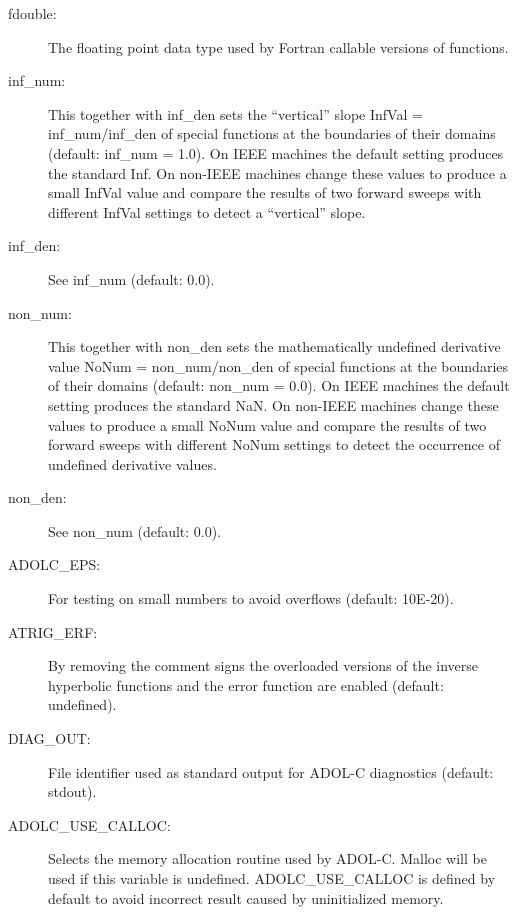 \documentclass[11pt,twoside]{article}
\begin{document}
\begin{description}
\item[{\sf fdouble}{\rm :}] The floating point data type used by Fortran callable versions of functions.

\item[{\sf inf\_num}{\rm :}] This together with {\sf inf\_den}
sets the ``vertical'' slope {\sf InfVal} = {\sf inf\_num/inf\_den}  
of special functions at the boundaries of their domains (default: {\sf inf\_num} = 1.0). On IEEE machines 
the default setting produces the standard {\sf Inf}. On non-IEEE machines
change these values to produce a small {\sf InfVal} value and compare
the results of two forward sweeps with different {\sf InfVal} settings
to detect a ``vertical'' slope.

\item[{\sf inf\_den}{\rm :}] See {\sf inf\_num} (default: 0.0).

\item[{\sf non\_num}{\rm :}] This together with {\sf non\_den} 
sets the mathematically 
undefined derivative value {\sf NoNum} = {\sf non\_num/non\_den}
of special functions at the boundaries of their domains (default: {\sf non\_num} = 0.0). On IEEE machines
the default setting produces the standard {\sf NaN}. On non-IEEE machines
change these values to produce a small {\sf NoNum} value and compare
the results of two forward sweeps with different {\sf NoNum} settings
to detect the occurrence of undefined derivative values.

\item[{\sf non\_den}{\rm :}] See {\sf non\_num} (default: 0.0).

\item[{\sf ADOLC\_EPS}{\rm :}] For testing on small numbers to avoid overflows (default: 10E-20).

\item[{\sf ATRIG\_ERF}{\rm :}] By removing the comment signs 
the overloaded versions of the inverse hyperbolic functions and 
the error function are enabled (default: undefined).

\item[{\sf DIAG\_OUT}{\rm :}] File identifier used as standard output for ADOL-C diagnostics (default: stdout).

\item[{\sf ADOLC\_USE\_CALLOC}{\rm :}] Selects the memory allocation routine
  used by ADOL-C. {\sf Malloc} will be used if this variable is
  undefined. {\sf ADOLC\_USE\_CALLOC} is defined by default to avoid incorrect
  result caused by uninitialized memory. 
\end{description}
%
\end{document}
